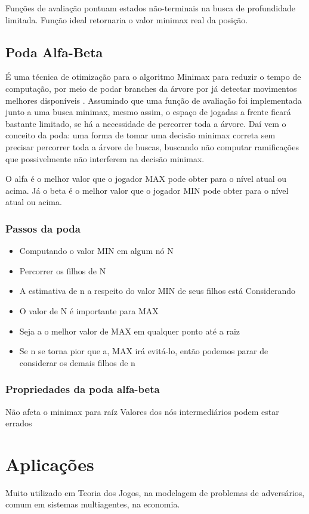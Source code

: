 \documentclass[sigplan,screen]{acmart}
\begin{document}
Funções de avaliação pontuam estados não-terminais na busca de profundidade limitada.
Função ideal retornaria o valor minimax real da posição.

\subsection{Poda Alfa-Beta}
É uma técnica de otimização para o algoritmo Minimax para reduzir o tempo de computação, por meio de podar branches da árvore por já detectar movimentos melhores disponíveis \cite{Aradhya04}.
Assumindo que uma função de avaliação foi implementada junto a uma busca minimax, mesmo assim, o espaço de jogadas a frente ficará bastante limitado, se há a necessidade de percorrer toda a árvore.
Daí vem o conceito da poda: uma forma de tomar uma decisão minimax correta sem precisar percorrer toda a árvore de buscas, buscando não computar ramificações que possivelmente não interferem na decisão minimax.

O alfa é o melhor valor que o jogador MAX pode obter para o nível atual ou acima. Já o beta é o melhor valor que o jogador MIN pode obter para o nível atual ou acima.

\subsubsection{Passos da poda}
\begin{itemize}
  \item Computando o valor MIN em algum nó N
  \item Percorrer os filhos de N
  \item A estimativa de n a respeito do valor MIN de seus filhos está Considerando
  \item O valor de N é importante para MAX
  \item Seja a o melhor valor de MAX em qualquer ponto até a raiz
  \item Se n se torna pior que a, MAX irá evitá-lo, então podemos parar de considerar os demais filhos de n
\end{itemize}

\subsubsection{Propriedades da poda alfa-beta}
Não afeta o minimax para raíz
Valores dos nós intermediários podem estar errados

\section{Aplicações}
Muito utilizado em Teoria dos Jogos, na modelagem de problemas de adversários, comum em sistemas multiagentes, na economia.
\end{document}
